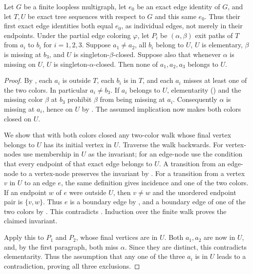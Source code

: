 \begin{lemma}
Let $G$ be a finite loopless multigraph, let $e_0$ be an exact edge identity
of $G$, and let $T,U$ be exact tree sequences with respect to $G$ and this
same $e_0$.  Thus their first exact edge identities both equal $e_0$,
as individual edges, not merely in their endpoints.  Under
the partial edge coloring $\varphi$, let $P_i$ be $(\alpha,\beta)$ exit paths of
$T$ from $a_i$ to $b_i$ for $i=1,2,3$.  Suppose $a_1\ne a_2$,
all $b_i$ belong to $U$, $U$ is elementary, $\beta$ is missing at
$b_3$, and $U$ is singleton-$\beta$-closed.  Suppose also that whenever
$\alpha$ is missing on $U$, $U$ is singleton-$\alpha$-closed.
Then none of $a_1,a_2,a_3$ belongs to $U$.
\end{lemma}
\begin{proof}
By , each $a_i$ is outside $T$, each $b_i$ is in
$T$, and each $a_i$ misses at least one of the two colors.  In particular
$a_i\ne b_3$.  If $a_i$ belongs to $U$, elementarity
() and the missing color $\beta$ at
$b_3$ prohibit $\beta$ from being missing at $a_i$.  Consequently
$\alpha$ is missing at $a_i$, hence on $U$ by
.  The assumed implication now makes both
colors closed on $U$.

We show that with both colors closed any two-color walk whose final
vertex belongs to $U$ has its initial vertex in $U$.  Traverse the walk
backwards.  For vertex-nodes use membership in $U$ as the invariant; for
an edge-node use the condition that every endpoint of that exact edge
belongs to $U$.  A transition from an edge-node to a vertex-node
preserves the invariant by .  For a
transition from a vertex $v$ in $U$ to an edge $e$, the same definition
gives incidence and one of the two colors.  If an endpoint $w$ of $e$
were outside $U$, then $v\ne w$ and the unordered endpoint pair is
$\{v,w\}$.  Thus $e$ is a boundary edge by ,
and a boundary edge of one of the two colors by
.  This contradicts
.  Induction over the finite walk proves
the claimed invariant.

Apply this to $P_1$ and $P_2$, whose final vertices are in $U$.  Both
$a_1,a_2$ are now in $U$, and, by the first paragraph, both miss
$\alpha$.  Since they are distinct, this contradicts elementarity.
Thus the assumption that any one of the three $a_i$ is in $U$ leads
to a contradiction, proving all three exclusions.
\end{proof}
